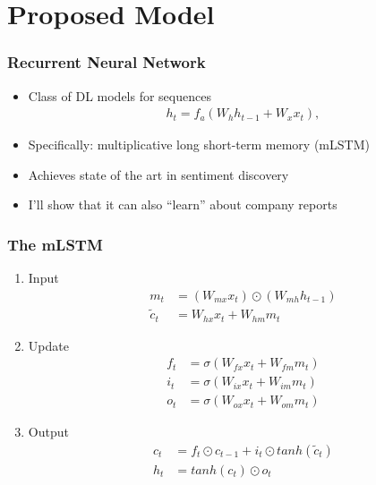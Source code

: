 \documentclass{beamer}
\begin{document}
\section{Proposed Model}

\begin{frame}
  \frametitle{Recurrent Neural Network}
  \begin{itemize}
  \item Class of DL models for sequences\\
    \begin{align}
     h_t = f_a(W_{h} h_{t-1} + W_{x} x_t),
    \end{align}
    
  \item Specifically: multiplicative long short-term memory (mLSTM)
  \item Achieves state of the art in sentiment discovery \citep{sentiment_neuron}
  \item I'll show that it can also ``learn'' about company reports
  \end{itemize}
\end{frame}

\begin{frame}
  \frametitle{The mLSTM}
  \begin{enumerate}
  \item Input
  \begin{align}
m_t &= (W_{mx} x_t) \odot (W_{mh} h_{t-1}) \label{eq:mult} \\
\tilde{c}_t &= W_{hx}x_t + W_{hm} m_t      \label{eq:prop}
\end{align}

\item Update
\begin{align}
f_t &= \sigma(W_{fx} x_t + W_{fm} m_t)      \label{eq:forget} \\
i_t &= \sigma(W_{ix} x_t + W_{im} m_t)     \label{eq:input} \\
o_t &= \sigma(W_{ox} x_t + W_{om} m_t)      \label{eq:output}
\end{align}

\item Output
\begin{align}
   c_t &= f_t \odot c_{t-1} + i_t \odot tanh(\tilde{c}_t) \label{eq:cell} \\
   h_t &= tanh(c_t) \odot o_t \label{eq:out}
\end{align}
\end{enumerate} 
\end{frame}
\end{document}
